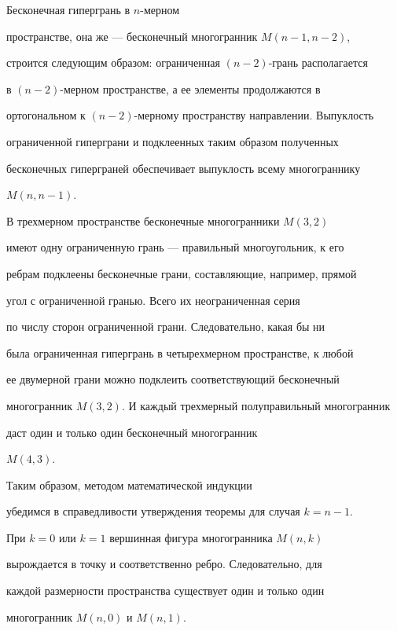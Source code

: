 \begin{pf} Бесконечная гипергрань в $n$-мерном  


пространстве, она же --- бесконечный многогранник $M(n-1,n-2)$, 


строится следующим образом: ограниченная $(n-2)$-грань располагается 


в $(n-2)$-мерном пространстве, а ее элементы продолжаются в 


ортогональном к $(n-2)$-мерному пространству направлении. Выпуклость 


ограниченной гиперграни и подклеенных таким образом полученных 


бесконечных гиперграней обеспечивает выпуклость всему многограннику 


$M(n,n-1)$. 


 


В трехмерном пространстве бесконечные многогранники $M(3,2)$ 


имеют одну ограниченную грань --- правильный многоугольник, к его 


ребрам подклеены бесконечные грани, составляющие, например, прямой 


угол с ограниченной гранью. Всего их неограниченная серия 


по числу сторон ограниченной грани. Следовательно, какая бы ни  


была ограниченная гипергрань в четырехмерном пространстве, к любой 


ее двумерной грани можно подклеить соответствующий бесконечный 


многогранник $M(3,2)$. И каждый трехмерный полуправильный многогранник 


даст один и только один бесконечный многогранник  


$M(4,3)$. 


Таким образом, методом математической индукции 


убедимся в справедливости утверждения теоремы для случая $k=n-1$. 


 


При $k=0$ или $k=1$ вершинная фигура многогранника $M(n,k)$ 


вырождается в точку и соответственно ребро. Следовательно, для 


каждой размерности пространства существует один и только один 


многогранник $M(n,0)$ и $M(n,1)$. 



\end{pf}
